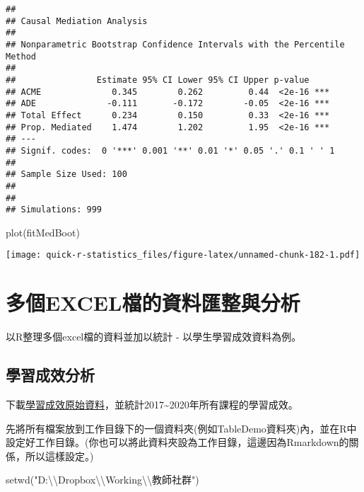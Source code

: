 \documentclass[
]{book}
\newenvironment{Shaded}{\begin{snugshade}}{\end{snugshade}}
\newcommand{\FunctionTok}[1]{\textcolor[rgb]{0.00,0.00,0.00}{#1}}
\newcommand{\NormalTok}[1]{#1}
\newcommand{\SpecialCharTok}[1]{\textcolor[rgb]{0.00,0.00,0.00}{#1}}
\newcommand{\StringTok}[1]{\textcolor[rgb]{0.31,0.60,0.02}{#1}}
\begin{document}
\begin{verbatim}
## 
## Causal Mediation Analysis 
## 
## Nonparametric Bootstrap Confidence Intervals with the Percentile Method
## 
##                Estimate 95% CI Lower 95% CI Upper p-value    
## ACME              0.345        0.262         0.44  <2e-16 ***
## ADE              -0.111       -0.172        -0.05  <2e-16 ***
## Total Effect      0.234        0.150         0.33  <2e-16 ***
## Prop. Mediated    1.474        1.202         1.95  <2e-16 ***
## ---
## Signif. codes:  0 '***' 0.001 '**' 0.01 '*' 0.05 '.' 0.1 ' ' 1
## 
## Sample Size Used: 100 
## 
## 
## Simulations: 999
\end{verbatim}

\begin{Shaded}
\begin{Highlighting}[]
\FunctionTok{plot}\NormalTok{(fitMedBoot)}
\end{Highlighting}
\end{Shaded}

\texttt{[image: quick-r-statistics\_files/figure-latex/unnamed-chunk-182-1.pdf]}

\hypertarget{multisheets}{%
\chapter{多個EXCEL檔的資料匯整與分析}\label{multisheets}}

以R整理多個excel檔的資料並加以統計 - 以學生學習成效資料為例。

\hypertarget{ux5b78ux7fd2ux6210ux6548ux5206ux6790}{%
\section{學習成效分析}\label{ux5b78ux7fd2ux6210ux6548ux5206ux6790}}

下載\href{https://drive.google.com/drive/u/0/folders/1-eNELkxrsLIdgfEX4S3nZIvmhnC00fEt}{學習成效原始資料}，並統計2017\textasciitilde2020年所有課程的學習成效。

先將所有檔案放到工作目錄下的一個資料夾(例如TableDemo資料夾)內，並在R中設定好工作目錄。(你也可以將此資料夾設為工作目錄，這邊因為Rmarkdown的關係，所以這樣設定。)

\begin{Shaded}
\begin{Highlighting}[]
\FunctionTok{setwd}\NormalTok{(}\StringTok{"D:}\SpecialCharTok{\textbackslash{}\textbackslash{}}\StringTok{Dropbox}\SpecialCharTok{\textbackslash{}\textbackslash{}}\StringTok{Working}\SpecialCharTok{\textbackslash{}\textbackslash{}}\StringTok{教師社群"}\NormalTok{)}
\end{Highlighting}
\end{Shaded}
\end{document}
